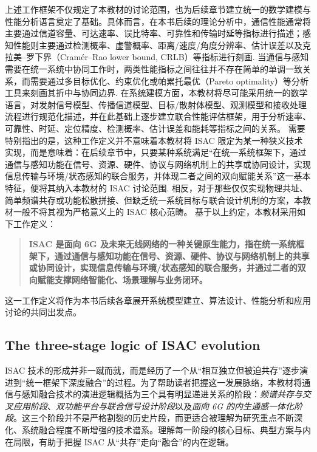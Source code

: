 上述工作框架不仅规定了本教材的讨论范围，也为后续章节建立统一的数学建模与性能分析语言奠定了基础。具体而言，在本书后续的理论分析中，通信性能通常将主要通过信道容量、可达速率、误比特率、可靠性和传输时延等指标进行描述；感知性能则主要通过检测概率、虚警概率、距离/速度/角度分辨率、估计误差以及克拉美--罗下界（Cram\'er--Rao lower bound, CRLB）等指标进行刻画\cite{Liu2022ISAC,Zhang2021ISAC6G}. 当通信与感知需要在统一系统中协同工作时，两类性能指标之间往往并不存在简单的单调一致关系，而需要通过多目标优化、约束优化或帕累托最优（Pareto optimality）等分析工具来刻画其折中与协同边界\cite{Liu2020JointRadarComm}. 在系统建模方面，本教材将尽可能采用统一的数学语言，对发射信号模型、传播信道模型、目标/散射体模型、观测模型和接收处理流程进行规范化描述，并在此基础上逐步建立联合性能评估框架，用于分析速率、可靠性、时延、定位精度、检测概率、估计误差和能耗等指标之间的关系。
需要特别指出的是，这种工作定义并不意味着本教材将 ISAC 限定为某一种狭义技术实现，而是意味着：在后续章节中，只要某种系统满足“在统一系统框架下，通过通信与感知功能在信号、资源、硬件、协议与网络机制上的共享或协同设计，实现信息传输与环境/状态感知的联合服务，并体现二者之间的双向赋能关系”这一基本特征，便将其纳入本教材的 ISAC 讨论范围\cite{Liu2022ISAC,Gonzalez2024integrated}. 相反，对于那些仅仅实现物理共址、简单频谱共存或功能松散拼接、但缺乏统一系统目标与联合设计机制的方案，本教材一般不将其视为严格意义上的 ISAC 核心范畴。
基于以上约定，本教材采用如下工作定义：
\begin{quote}
\textbf{ISAC 是面向 6G 及未来无线网络的一种关键原生能力，指在统一系统框架下，通过通信与感知功能在信号、资源、硬件、协议与网络机制上的共享或协同设计，实现信息传输与环境/状态感知的联合服务，并通过二者的双向赋能支撑网络智能化、场景理解与业务闭环。}
\end{quote}
这一工作定义将作为本书后续各章展开系统模型建立、算法设计、性能分析和应用讨论的共同出发点。

\subsection{The three-stage logic of ISAC evolution}
\label{subsec:ch1-evolution-logic}

ISAC 技术的形成并非一蹴而就，而是经历了一个从“相互独立但被迫共存”逐步演进到“统一框架下深度融合”的过程。为了帮助读者把握这一发展脉络，本教材将通信与感知融合技术的演进逻辑概括为三个具有明显递进关系的阶段：\emph{频谱共存与交叉应用阶段}、\emph{双功能平台与联合信号设计阶段}以及\emph{面向 6G 的内生通感一体化阶段}。这三个阶段并不是严格割裂的历史片段，而更适合被理解为研究重点不断深化、系统融合程度不断增强的技术谱系。理解每一阶段的核心目标、典型方案与内在局限，有助于把握 ISAC 从“共存”走向“融合”的内在逻辑。

